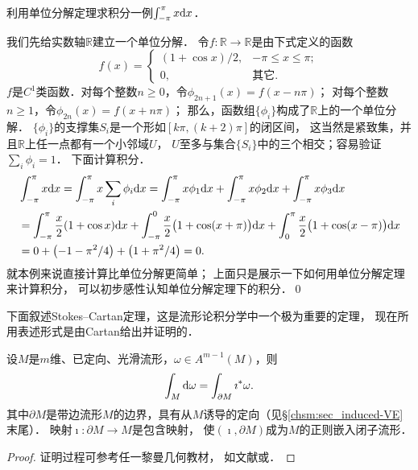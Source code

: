 \begin{example}
    利用单位分解定理求积分一例$\int_{-\pi}^{\pi}x {\rm d}x$．
\end{example}
我们先给实数轴$\mathbb{R}$建立一个单位分解．
令$f:\mathbb{R}\to \mathbb{R}$是由下式定义的函数
\begin{equation}
    f(x)=\begin{cases}
        (1+\cos x)/2, & -\pi \leqslant x \leqslant \pi ; \\
        0, & \text{其它} .
    \end{cases}
\end{equation}
$f$是$C^1$类函数．对每个整数$n\geqslant 0$，令$\phi_{2n+1}(x)=f(x-n \pi)$；
对每个整数$n\geqslant 1$，令$\phi_{2n}(x)=f(x+n \pi)$；
那么，函数组$\{\phi_i\}$构成了$\mathbb{R}$上的一个单位分解．
$\{\phi_i\}$的支撑集$S_i$是一个形如$[k\pi,(k+2)\pi]$的闭区间，
这当然是紧致集，并且$\mathbb{R}$上任一点都有一个小邻域$U$，
$U$至多与集合$\{S_i\}$中的三个相交；容易验证$\sum_i \phi_i =1$．
下面计算积分．
\begin{align*}
    &\int_{-\pi}^{\pi}x {\rm d}x = \int_{-\pi}^{\pi}x\sum_i\phi_i {\rm d}x
    =\int_{-\pi}^{\pi}x \phi_1 {\rm d}x 
    +\int_{-\pi}^{\pi}x \phi_2 {\rm d}x
    +\int_{-\pi}^{\pi}x \phi_3 {\rm d}x \\
    &=\int_{-\pi}^{\pi} \frac{x}{2} (1+\cos x) {\rm d}x 
    +\int_{-\pi}^{0}\frac{x}{2} \bigl(1+\cos (x+\pi)\bigr) {\rm d}x
    +\int_{0}^{\pi}\frac{x}{2} \bigl(1+\cos (x-\pi)\bigr) {\rm d}x \\
    &= 0+\left(-1-\pi^2/4\right) + \left(1+\pi^2/4\right) =0.
\end{align*}
就本例来说直接计算比单位分解更简单；
上面只是展示一下如何用单位分解定理来计算积分，
可以初步感性认知单位分解定理下的积分．\qed



下面叙述Stokes--Cartan定理，这是流形论积分学中一个极为重要的定理，
现在所用表述形式是由Cartan给出并证明的．
\begin{theorem}\label{chdf:thm_stokes-cartan}
    设$M$是$m$维、已定向、光滑流形，$\omega \in A^{m-1}(M)$，则
    \begin{equation}\label{chdf:eqn_stokes-cartan}
        \int_{M} {\rm d} \omega =  \int_{\partial M} \imath^{*} \omega .
    \end{equation}
    其中$\partial M$是带边流形$M$的边界，具有从$M$诱导的定向（见\S\ref{chsm:sec_induced-VE}末尾）．
    映射$\imath:\partial M \to M$是包含映射，
    使$(\imath,\partial M)$成为$M$的正则嵌入闭子流形．
\end{theorem}
\begin{proof}
    证明过程可参考任一黎曼几何教材，
    如文献\parencite[\S 3.4]{cc2001-zh}或\parencite[\S 8.6]{spivak-dif-1}．
\end{proof}


